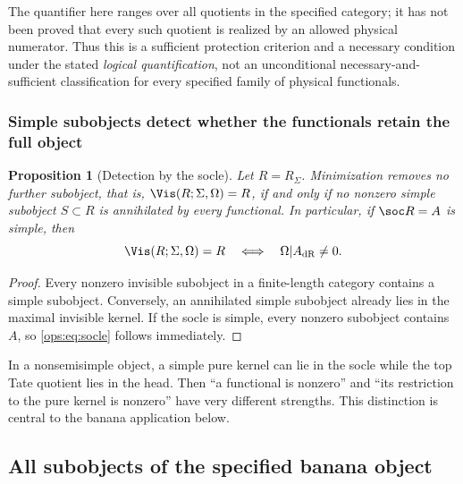 \documentclass[11pt,a4paper,oneside]{article}
\theoremstyle{plain}
\newtheorem{proposition}[theorem]{Proposition}
\theoremstyle{definition}
\theoremstyle{remark}
\newcommand{\dR}{\mathrm{dR}}
\numberwithin{equation}{section}
\begin{document}
The quantifier here ranges over all quotients in the specified category; it has not been proved that every such quotient is realized by an allowed physical numerator.
Thus this is a sufficient protection criterion and a necessary condition under the stated \emph{logical quantification},
not an unconditional necessary-and-sufficient classification for every specified family of physical functionals.

\subsubsection{Simple subobjects detect whether the functionals retain the full object}
\begin{proposition}[Detection by the socle]\label{ops:prop:socle}
Let $R=R_\Sigma$. Minimization removes no further subobject, that is,
$\Vis(R;\Sigma,\Omega)=R$, if and only if no nonzero simple subobject
$S\subset R$ is annihilated by every functional.
In particular, if $\soc R=A$ is simple, then
\begin{equation}\label{ops:eq:socle}
 \Vis(R;\Sigma,\Omega)=R
 \quad\Longleftrightarrow\quad \Omega|A_{\dR}\ne0.
\end{equation}
\end{proposition}
\begin{proof}
Every nonzero invisible subobject in a finite-length category contains a simple subobject.
Conversely, an annihilated simple subobject already lies in the maximal invisible kernel.
If the socle is simple, every nonzero subobject contains $A$, so \eqref{ops:eq:socle} follows immediately.
\end{proof}

In a nonsemisimple object, a simple pure kernel can lie in the socle while the top Tate quotient lies in the head.
Then ``a functional is nonzero'' and ``its restriction to the pure kernel is nonzero'' have very different strengths.
This distinction is central to the banana application below.


\subsection{All subobjects of the specified banana object}
\end{document}
